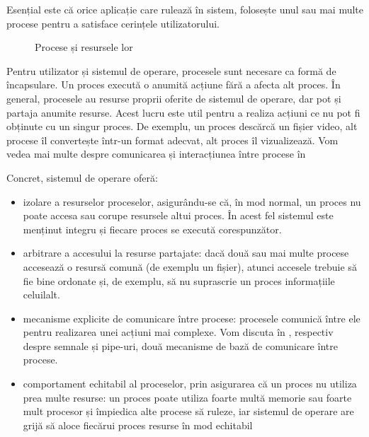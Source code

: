 \begin{note}
  Esențial este că orice aplicație care rulează în sistem, folosește unul sau mai multe procese pentru a satisface cerințele utilizatorului.
\end{note}

\begin{figure}[!htbp]
  \centering
  \def\svgwidth{0.5\textwidth}
  
  \caption{Procese și resursele lor}
  \label{fig:process:overview}
\end{figure}

Pentru utilizator și sistemul de operare, procesele sunt necesare ca formă de încapsulare.
Un proces execută o anumită acțiune fără a afecta alt proces.
În general, procesele au resurse proprii oferite de sistemul de operare, dar pot și partaja anumite resurse.
Acest lucru este util pentru a realiza acțiuni ce nu pot fi obținute cu un singur proces.
De exemplu, un proces descărcă un fișier video, alt procese îl convertește într-un format adecvat, alt proces îl vizualizează.
Vom vedea mai multe despre comunicarea și interacțiunea între procese în 

Concret, sistemul de operare oferă:

\begin{itemize}
  \item izolare a resurselor proceselor, asigurându-se că, în mod normal, un proces nu poate accesa sau corupe resursele altui proces.
    În acest fel sistemul este menținut integru și fiecare proces se execută corespunzător.
  \item arbitrare a accesului la resurse partajate: dacă două sau mai multe procese accesează o resursă comună (de exemplu un fișier), atunci accesele trebuie să fie bine ordonate și, de exemplu, să nu suprascrie un proces informațiile celuilalt.
  \item mecanisme explicite de comunicare între procese: procesele comunică între ele pentru realizarea unei acțiuni mai complexe.
    Vom discuta în , respectiv  despre semnale și pipe-uri, două mecanisme de bază de comunicare între procese.
  \item comportament echitabil al proceselor, prin asigurarea că un proces nu utiliza prea multe resurse: un proces poate utiliza foarte multă memorie sau foarte mult procesor și împiedica alte procese să ruleze, iar sistemul de operare are grijă să aloce fiecărui proces resurse în mod echitabil
\end{itemize}

